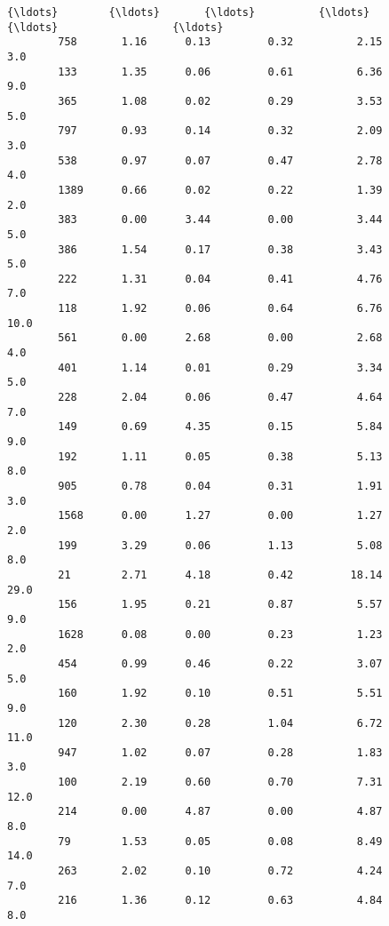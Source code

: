 \documentclass[11pt]{article}
\begin{document}
\begin{Verbatim}[commandchars=\\\{\}]
        {\ldots}        {\ldots}       {\ldots}          {\ldots}           {\ldots}                  {\ldots}   
        758       1.16      0.13         0.32          2.15                  3.0   
        133       1.35      0.06         0.61          6.36                  9.0   
        365       1.08      0.02         0.29          3.53                  5.0   
        797       0.93      0.14         0.32          2.09                  3.0   
        538       0.97      0.07         0.47          2.78                  4.0   
        1389      0.66      0.02         0.22          1.39                  2.0   
        383       0.00      3.44         0.00          3.44                  5.0   
        386       1.54      0.17         0.38          3.43                  5.0   
        222       1.31      0.04         0.41          4.76                  7.0   
        118       1.92      0.06         0.64          6.76                 10.0   
        561       0.00      2.68         0.00          2.68                  4.0   
        401       1.14      0.01         0.29          3.34                  5.0   
        228       2.04      0.06         0.47          4.64                  7.0   
        149       0.69      4.35         0.15          5.84                  9.0   
        192       1.11      0.05         0.38          5.13                  8.0   
        905       0.78      0.04         0.31          1.91                  3.0   
        1568      0.00      1.27         0.00          1.27                  2.0   
        199       3.29      0.06         1.13          5.08                  8.0   
        21        2.71      4.18         0.42         18.14                 29.0   
        156       1.95      0.21         0.87          5.57                  9.0   
        1628      0.08      0.00         0.23          1.23                  2.0   
        454       0.99      0.46         0.22          3.07                  5.0   
        160       1.92      0.10         0.51          5.51                  9.0   
        120       2.30      0.28         1.04          6.72                 11.0   
        947       1.02      0.07         0.28          1.83                  3.0   
        100       2.19      0.60         0.70          7.31                 12.0   
        214       0.00      4.87         0.00          4.87                  8.0   
        79        1.53      0.05         0.08          8.49                 14.0   
        263       2.02      0.10         0.72          4.24                  7.0   
        216       1.36      0.12         0.63          4.84                  8.0   
        

\end{Verbatim}
\end{document}
